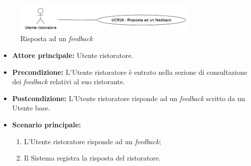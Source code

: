 \label{usecase:Risposta ad un feedback}

\begin{figure}[h]
	\centering
	\includegraphics[width=0.8\textwidth]{./uml/UCR16.png} 
	\caption{Risposta ad un \textit{feedback}}
	\label{fig:UCR16}
  \end{figure}

\begin{itemize}
	\item \textbf{Attore principale:} Utente ristoratore.

	\item \textbf{Precondizione:} L'Utente ristoratore è entrato nella sezione di consultazione dei \textit{feedback} relativi al suo ristorante.

	\item \textbf{Postcondizione:} L'Utente ristoratore risponde ad un \textit{feedback} scritto da un Utente base.


	\item \textbf{Scenario principale:}
	      \begin{enumerate}
		      \item L'Utente ristoratore risponde ad un \textit{feedback};
		      \item Il Sistema registra la risposta del ristoratore.

	      \end{enumerate}
\end{itemize}
